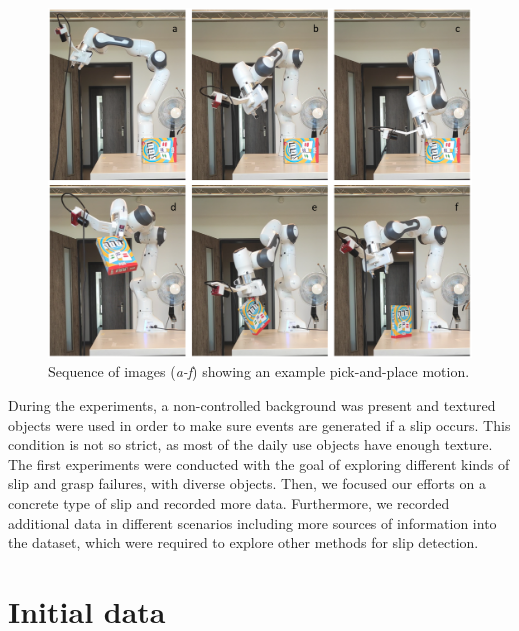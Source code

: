 \begin{figure}[h]
    \centering
    \includegraphics[width=\textwidth]{resources/images/rob_traj}
    \caption{Sequence of images (\textit{a-f}) showing an example pick-and-place motion.}\label{fig:rob_traj}
\end{figure}

During the experiments, a non-controlled background was present and textured objects were used in order to make sure events are generated if a slip occurs. This condition is not so strict, as most of the daily use objects have enough texture.\\

The first experiments were conducted with the goal of exploring different kinds of slip and grasp failures, with diverse objects. Then, we focused our efforts on a concrete type of slip and recorded more data. Furthermore, we recorded additional data in different scenarios including more sources of information into the dataset, which were required to explore other methods for slip detection.

\section{Initial data}

